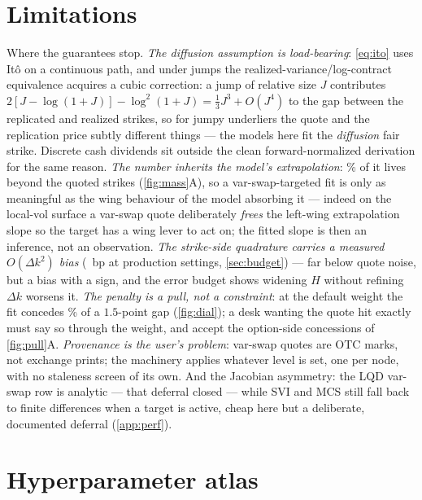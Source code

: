 \documentclass[11pt]{article}
\begin{document}
\section{Limitations}
\label{sec:limits}

Where the guarantees stop.  \emph{The diffusion assumption is load-bearing}:
\eqref{eq:ito} uses It\^o on a continuous path, and under jumps the
realized-variance/log-contract equivalence acquires a cubic correction:
a jump of relative size $J$ contributes
$2[J-\log(1+J)]-\log^{2}(1+J)=\tfrac13J^{3}+O(J^{4})$ to the gap between
the replicated and realized strikes, so for jumpy underliers the quote
and the replication price subtly different things --- the models here
fit the \emph{diffusion} fair strike.  Discrete cash dividends sit outside the clean
forward-normalized derivation for the same reason.  \emph{The number
inherits the model's extrapolation}: \vsrwingsharepct\% of it lives
beyond the quoted strikes (\cref{fig:mass}A), so a var-swap-targeted fit
is only as meaningful as the wing behaviour of the model absorbing it
--- indeed on the local-vol surface a var-swap quote deliberately
\emph{frees} the left-wing extrapolation slope so the target has a wing
lever to act on; the fitted slope is then an inference, not an
observation.  \emph{The strike-side quadrature carries a measured
$O(\Delta k^{2})$ bias} (\vsragreebp\ bp at production settings,
\cref{sec:budget}) --- far below quote noise, but a bias with a sign,
and the error budget shows widening $H$ without refining $\Delta k$
worsens it.  \emph{The penalty is a pull, not a constraint}: at the
default weight the fit concedes \vsrpullsharepct\% of a $1.5$-point gap
(\cref{fig:dial}); a desk wanting the quote hit exactly must say so
through the weight, and accept the option-side concessions of
\cref{fig:pull}A.  \emph{Provenance is the user's problem}: var-swap
quotes are OTC marks, not exchange prints; the machinery applies
whatever level is set, one per node, with no staleness screen of its
own.  And the Jacobian asymmetry: the LQD var-swap row is analytic ---
that deferral closed --- while SVI and MCS still fall back to finite
differences when a target is active, cheap here but a deliberate,
documented deferral (\cref{app:perf}).

\appendix
\section{Hyperparameter atlas}
\label{app:atlas}
\end{document}
